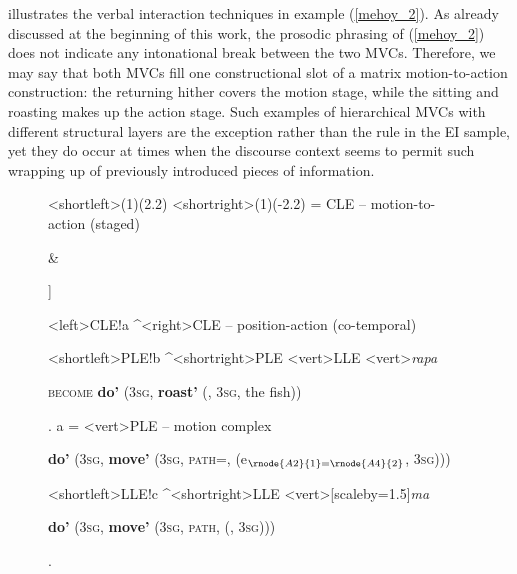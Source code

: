 illustrates the verbal interaction techniques in example (\ref{mehoy_2}). As already discussed at the beginning of this work, the prosodic phrasing of (\ref{mehoy_2}) does not indicate any intonational break between the two MVCs. Therefore, we may say that both MVCs fill one constructional slot of a matrix motion-to-action construction: the returning hither covers the motion stage, while the sitting and roasting makes up the action stage. Such examples of hierarchical MVCs with different structural layers are the exception rather than the rule in the EI sample, yet they do occur at times when the discourse context seems to permit such wrapping up of previously introduced pieces of information.

\begin{sidewaysfigure}
\jtree[xunit=12em,yunit=2em]
<shortleft>(1)(2.2)
<shortright>(1)(-2.2)
\! = {CLE -- motion-to-action (staged)}
{\begin{scriptsize} [[ \textbf{do'} (3\textsc{sg}, \textbf{move'} (3\textsc{sg}, \textsc{path=come}, \textbf{return'} (e$_{1=2}$, 3\textsc{sg}))) ] \& \end{scriptsize}}
{\begin{scriptsize} ]\end{scriptsize}}
<left>{CLE}!a ^<right>{CLE -- position-action (co-temporal)}{\begin{scriptsize} \end{scriptsize}}
<shortleft>{PLE}!b ^<shortright>{PLE}
<vert>{LLE}
<vert>{\textit{rapa}}{\begin{scriptsize} \textsc{become} \textbf{do'} (3\textsc{sg}, \textbf{roast'} (, 3\textsc{sg}, the fish))\end{scriptsize}}.
\!a = <vert>{PLE -- motion complex}{\begin{scriptsize} \textbf{do'} (3\textsc{sg}, \textbf{move'} (3\textsc{sg}, \textsc{path=}, \textbf{} (e$_{\rnode{A2}{1}=\rnode{A4}{2}}$, 3\textsc{sg}))) \end{scriptsize}}
<shortleft>{LLE}!c ^<shortright>{LLE}
<vert>[scaleby=1.5]{\textit{ma}}
{\begin{scriptsize} \textbf{do'} (3\textsc{sg}, \textbf{move'} (3\textsc{sg}, \textsc{path}, \textbf{} (, 3\textsc{sg})))\end{scriptsize}}.

\end{sidewaysfigure}
